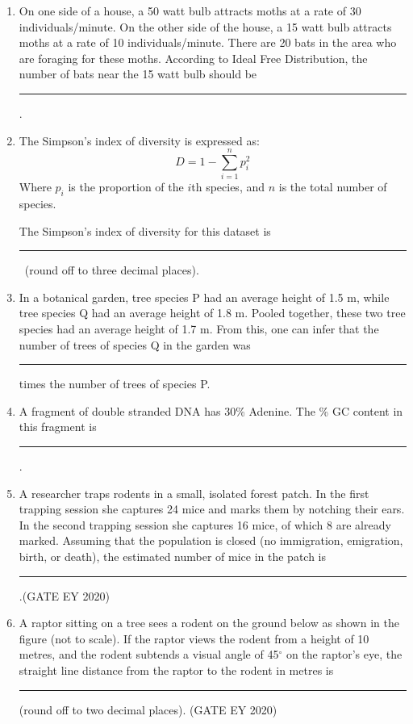 \begin{enumerate}
\item On one side of a house, a 50 watt bulb attracts moths at a rate of 30 individuals/minute. On the other side of the house, a 15 watt bulb attracts moths at a rate of 10 individuals/minute. There are 20 bats in the area who are foraging for these moths. According to Ideal Free Distribution, the number of bats near the 15 watt bulb should be \rule{2cm}{0.15mm}.

\item The Simpson’s index of diversity is expressed as:
\[
D = 1 - \sum_{i=1}^n p_i^2
\]
Where $p_i$ is the proportion of the $i$th species, and $n$ is the total number of species.



The Simpson’s index of diversity for this dataset is \rule{2cm}{0.15mm}\ (round off to three decimal places).

\item In a botanical garden, tree species P had an average height of 1.5 m, while tree species Q had an average height of 1.8 m. Pooled together, these two tree species had an average height of 1.7 m. From this, one can infer that the number of trees of species Q in the garden was \rule{2cm}{0.15mm} times the number of trees of species P.

\item A fragment of double stranded DNA has 30\% Adenine. The \% GC content in this fragment is \rule{2cm}{0.15mm}.

\item A researcher traps rodents in a small, isolated forest patch. In the first trapping session she captures 24 mice and marks them by notching their ears. In the second trapping session she captures 16 mice, of which 8 are already marked. Assuming that the population is closed (no immigration, emigration, birth, or death), the estimated number of mice in the patch is \rule{2cm}{0.15mm}.\hfill {(GATE EY 2020)}
\item A raptor sitting on a tree sees a rodent on the ground below as shown in the figure (not to scale). If the raptor views the rodent from a height of 10 metres, and the rodent subtends a visual angle of 45$^\circ$ on the raptor's eye, the straight line distance from the raptor to the rodent in metres is \rule{2cm}{0.15mm} (round off to two decimal places). \hfill {(GATE EY 2020)}


\end{enumerate}
